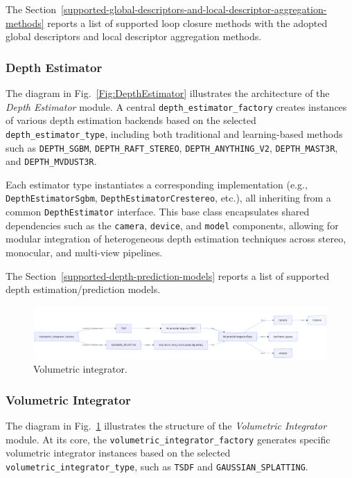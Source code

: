 \documentclass{article}
\begin{document}
The Section~\ref{supported-global-descriptors-and-local-descriptor-aggregation-methods} reports a list of supported loop closure methods with the adopted global descriptors and local descriptor aggregation methods.


\subsubsection{Depth Estimator}

The diagram in Fig.~\ref{Fig:DepthEstimator} illustrates the architecture of the \textit{Depth Estimator} module. A central \texttt{depth\_estimator\_factory} creates instances of various depth estimation backends based on the selected \texttt{depth\_estimator\_type}, including both traditional and learning-based methods such as \texttt{DEPTH\_SGBM}, \texttt{DEPTH\_RAFT\_STEREO}, \texttt{DEPTH\_ANYTHING\_V2}, \texttt{DEPTH\_MAST3R}, and \texttt{DEPTH\_MVDUST3R}.

Each estimator type instantiates a corresponding implementation (e.g., \texttt{DepthEstimatorSgbm}, \texttt{DepthEstimatorCrestereo}, etc.), all inheriting from a common \texttt{DepthEstimator} interface. This base class encapsulates shared dependencies such as the \texttt{camera}, \texttt{device}, and \texttt{model} components, allowing for modular integration of heterogeneous depth estimation techniques across stereo, monocular, and multi-view pipelines.

The Section~\ref{supported-depth-prediction-models} reports a list of supported depth estimation/prediction models.

\begin{figure}[!t]
\begin{center}
    \includegraphics[width=\textwidth]{./images/volumetric_integrator.png}
\end{center}
\caption{Volumetric integrator.}
\label{Fig:VolumetricIntegrator}
\end{figure}

\subsubsection{Volumetric Integrator}

The diagram in Fig.~\ref{Fig:VolumetricIntegrator} illustrates the structure of the \textit{Volumetric Integrator} module. At its core, the \texttt{volumetric\_integrator\_factory} generates specific volumetric integrator instances based on the selected \texttt{volumetric\_integrator\_type}, such as \texttt{TSDF} and \texttt{GAUSSIAN\_SPLATTING}.
\end{document}
